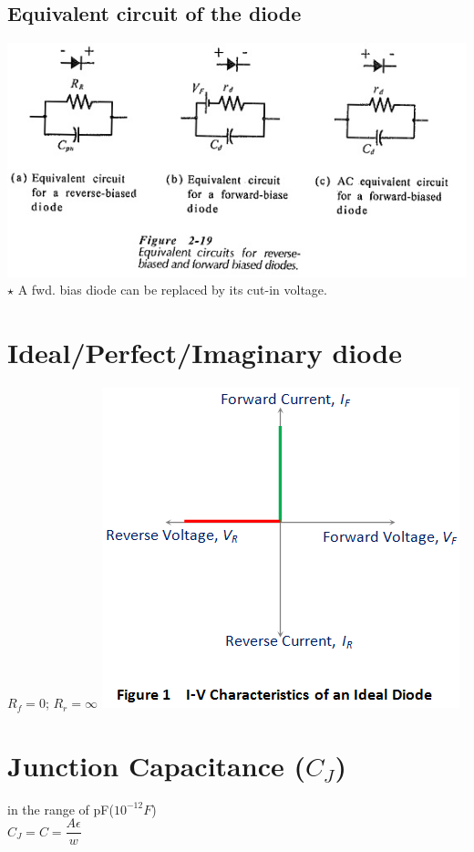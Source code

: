 \documentclass[10pt, a4paper]{report}
\begin{document}
	\subsection{Equivalent circuit of the diode}
		\includegraphics[width=\linewidth]{img/Equivalent-Circuit-of-Diode}
		$\star$ A fwd. bias diode can be replaced by its cut-in voltage.
	\section{Ideal/Perfect/Imaginary diode} 
	$ R_f = 0 $; $ R_r = \infty $
		\includegraphics[width=0.7\linewidth]{img/ideal-diode-vi}
	\section{Junction Capacitance ($ C_J $)}
	in the range of pF($ 10^{-12} F $) \\
	$ C_J = C = \dfrac{A \epsilon}{w} $
	
\end{document}
